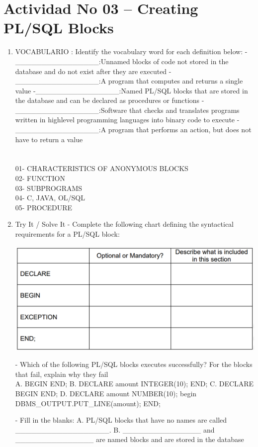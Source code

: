 \section{Actividad No 03 –  Creating PL/SQL Blocks} 
		
\begin{enumerate}[1.]
	\item VOCABULARIO :
	\subitem Identify the vocabulary word for each definition below:
	-\_\_\_\_\_\_\_\_\_\_\_\_\_\_\_\_:Unnamed blocks of code not stored in the database and do not exist after they are executed
	-\_\_\_\_\_\_\_\_\_\_\_\_\_\_\_\_:A program that computes and returns a single value
	-\_\_\_\_\_\_\_\_\_\_\_\_\_\_\_\_:Named PL/SQL blocks that are stored in the database and can be declared as procedures or functions
	-\_\_\_\_\_\_\_\_\_\_\_\_\_\_\_\_:Software that checks and translates programs written in highlevel programming languages into binary code to execute
	-\_\_\_\_\_\_\_\_\_\_\_\_\_\_\_\_:A program that performs an action, but does not have to return a value
	\\\\
	\\01- CHARACTERISTICS OF ANONYMOUS BLOCKS
	\\02- FUNCTION
	\\03- SUBPROGRAMS
	\\04- C, JAVA, OL/SQL
	\\05- PROCEDURE

	\item Try It / Solve It
	- Complete the following chart defining the syntactical requirements for a PL/SQL block:

	\begin{center}
	\includegraphics[width=15cm]{./Imagenes/actividad01}  
	\end{center}	
	- Which of the following PL/SQL blocks executes successfully? For the blocks that fail, explain why they fail
	\\
	\subitem A. BEGIN
	\subitem    END;
	\subitem B. DECLARE
 	\subitem    amount INTEGER(10);
	\subitem    END;
	\subitem C. DECLARE
	 \subitem   BEGIN
	 \subitem   END;
	\subitem D. DECLARE
	 \subitem	amount NUMBER(10);
	 \subitem	begin
	 \subitem	DBMS\_OUTPUT.PUT\_LINE(amount);
	 \subitem	END;
	
	- Fill in the blanks:
	\subitem A. PL/SQL blocks that have no names are called \_\_\_\_\_\_\_\_\_\_\_\_\_\_\_\_\_\_.
	\subitem B. \_\_\_\_\_\_\_\_\_\_\_\_\_\_\_ and \_\_\_\_\_\_\_\_\_\_\_\_\_\_\_ are named blocks and are stored in the database

	

\end{enumerate}

